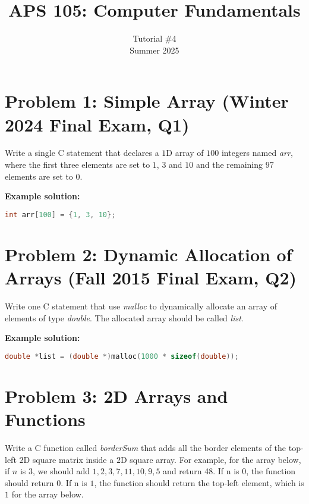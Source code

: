 \documentclass[12pt]{article}
\begin{document}
 
 
\title{APS 105: Computer Fundamentals}
\date{}
\author{Tutorial \#4\\ 
Summer 2025}

\maketitle

\section*{Problem 1: Simple Array (Winter 2024  Final Exam, Q1)}
Write a single C statement that declares a $1$D array of $100$ integers named \textit{arr}, where the first three elements are set to $1$, $3$ and $10$ and the remaining $97$ elements are set to $0$.


\textbf{Example solution:}
\begin{lstlisting}[language=C]
int arr[100] = {1, 3, 10};
\end{lstlisting}

\section*{Problem 2: Dynamic Allocation of Arrays (Fall 2015 Final Exam, Q2)}
Write one C statement that use \textit{malloc} to dynamically allocate an array of elements of type \textit{double}. The allocated array should be called \textit{list}.

\textbf{Example solution:}
\begin{lstlisting}[language=C]
double *list = (double *)malloc(1000 * sizeof(double));
\end{lstlisting}

\section*{Problem 3: 2D Arrays and Functions}

Write a C function called \textit{borderSum} that adds all the border elements of the top-left $2$D square matrix inside a $2$D square array. For example, for the array below, if $n$ is $3$, we should add ${1, 2, 3, 7, 11, 10, 9, 5}$ and return 48. If n is 0, the function should return $0$. If n is $1$, the function should return the top-left element, which is $1$ for the array below.
\end{document}
